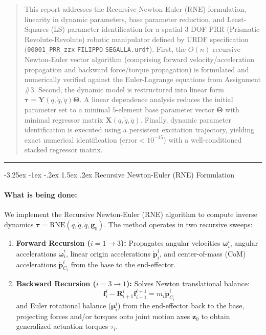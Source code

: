 \documentclass[11pt, a4paper]{article}
\makeatletter
\renewcommand{\subsection}{\@startsection{subsection}{2}{\z@}%
    {-3.25ex \@plus -1ex \@minus -.2ex}%
    {1.5ex \@plus .2ex}%
    {\normalfont\large\bfseries\color{brandaccent}}}
\makeatother
\begin{document}
\begin{abstract}
\noindent
This report addresses the Recursive Newton-Euler (RNE) formulation, linearity in dynamic parameters, base parameter reduction, and Least-Squares (LS) parameter identification for a spatial 3-DOF PRR (Prismatic-Revolute-Revolute) robotic manipulator defined by URDF specification (\texttt{00001\_PRR\_zzx} \texttt{FILIPPO} \texttt{SEGALLA.urdf}). First, the $O(n)$ recursive Newton-Euler vector algorithm (comprising forward velocity/acceleration propagation and backward force/torque propagation) is formulated and numerically verified against the Euler-Lagrange equations from Assignment \#3. Second, the dynamic model is restructured into linear form $\boldsymbol{\tau} = \mathbf{Y}(q, \dot{q}, \ddot{q})\boldsymbol{\Theta}$. A linear dependence analysis reduces the initial parameter set to a minimal $5$-element base parameter vector $\bar{\boldsymbol{\Theta}}$ with minimal regressor matrix $\mathbf{X}(q, \dot{q}, \ddot{q})$. Finally, dynamic parameter identification is executed using a persistent excitation trajectory, yielding exact numerical identification ($\text{error} < 10^{-15}$) with a well-conditioned stacked regressor matrix.
\end{abstract}

\hrule
\vspace{1.5em}

\subsection{Recursive Newton-Euler (RNE) Formulation}
\paragraph{What is being done:}
We implement the Recursive Newton-Euler (RNE) algorithm to compute inverse dynamics $\boldsymbol{\tau} = \text{RNE}(q, \dot{q}, \ddot{q}, \mathbf{g}_0)$. The method operates in two recursive sweeps:
\begin{enumerate}[leftmargin=1.5em]
    \item \textbf{Forward Recursion ($i = 1 \to 3$):} Propagates angular velocities $\boldsymbol{\omega}_i^i$, angular accelerations $\dot{\boldsymbol{\omega}}_i^i$, linear origin accelerations $\dot{\mathbf{p}}_i^i$, and center-of-mass (CoM) accelerations $\dot{\mathbf{p}}_{C_i}^i$ from the base to the end-effector.
    \item \textbf{Backward Recursion ($i = 3 \to 1$):} Solves Newton translational balance:
\begin{equation}
    \mathbf{f}_i^i - \mathbf{R}_{i+1}^i \mathbf{f}_{i+1}^{i+1} = m_i \dot{\mathbf{p}}_{C_i}^i
\end{equation}
and Euler rotational balance ($\boldsymbol{\mu}_i^i$) from the end-effector back to the base, projecting forces and/or torques onto joint motion axes $\mathbf{z}_0$ to obtain generalized actuation torques $\tau_i$.
\end{enumerate}
\end{document}

